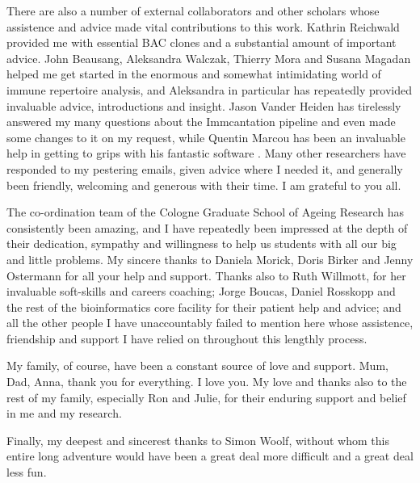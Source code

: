 \begin{acknowledgements}
There are also a number of external collaborators and other scholars whose assistence and advice made vital contributions to this work. Kathrin Reichwald provided me with essential BAC clones and a substantial amount of important advice. John Beausang, Aleksandra Walczak, Thierry Mora and Susana Magadan helped me get started in the enormous and somewhat intimidating world of immune repertoire analysis, and Aleksandra in particular has repeatedly provided invaluable advice, introductions and insight. Jason Vander Heiden has tirelessly answered my many questions about the Immcantation pipeline and even made some changes to it on my request, while Quentin Marcou has been an invaluable help in getting to grips with his fantastic software . Many other researchers have responded to my pestering emails, given advice where I needed it, and generally been friendly, welcoming and generous with their time. I am grateful to you all.

The co-ordination team of the Cologne Graduate School of Ageing Research has consistently been amazing, and I have repeatedly been impressed at the depth of their dedication, sympathy and willingness to help us students with all our big and little problems. My sincere thanks to Daniela Morick, Doris Birker and Jenny Ostermann for all your help and support. Thanks also to Ruth Willmott, for her invaluable soft-skills and careers coaching; Jorge Boucas, Daniel Rosskopp and the rest of the bioinformatics core facility for their patient help and advice; and all the other people I have unaccountably failed to mention here whose assistence, friendship and support I have relied on throughout this lengthly process.

My family, of course, have been a constant source of love and support. Mum, Dad, Anna, thank you for everything. I love you. My love and thanks also to the rest of my family, especially Ron and Julie, for their enduring support and belief in me and my research. 

Finally, my deepest and sincerest thanks to Simon Woolf, without whom this entire long adventure would have been a great deal more difficult and a great deal less fun.
\end{acknowledgements}